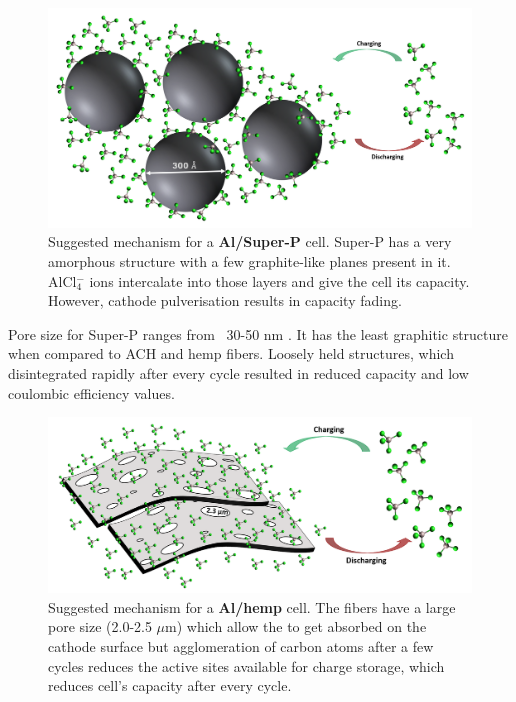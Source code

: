  \begin{figure}[tbh!]
  \centering
  \includegraphics[width=\textwidth]{Figures/chap5fig/superpmech}
    \caption{Suggested mechanism for a \textbf{Al/Super-P} cell. Super-P has a very amorphous structure with a few graphite-like planes present in it. AlCl$_{4}^{-}$ ions intercalate into those layers and give the cell its capacity. However, cathode pulverisation results in capacity fading.}
  \label{Figures/chap5figs:superPmech}
\end{figure}

Pore size for Super-P ranges from ~30-50 nm \cite{younesi_analysis_2015}. It has the least graphitic structure when compared to ACH and hemp fibers. Loosely held structures, which disintegrated rapidly after every cycle resulted in reduced capacity and low coulombic efficiency values.

 \begin{figure}[tbh!]
  \centering
  \includegraphics[width=\textwidth]{Figures/chap5fig/hempmech}
    \caption{Suggested mechanism for a \textbf{Al/hemp} cell. The fibers have a large pore size (2.0-2.5 $\mu$m) which allow the  to get absorbed on the cathode surface but agglomeration of carbon atoms after a few cycles reduces the active sites available for charge storage, which reduces cell's capacity after every cycle.}
  \label{Figures/chap5fig:hempmech}
\end{figure}

